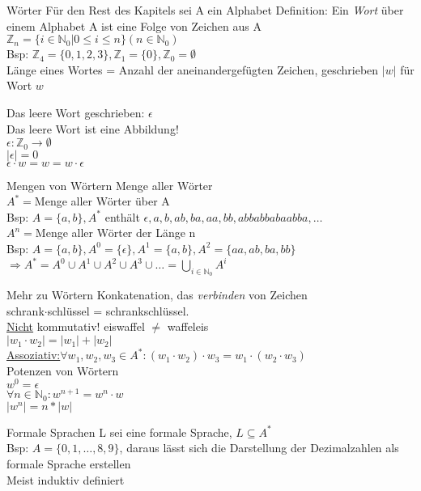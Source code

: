 \begin{frame}{Wörter}
	Für den Rest des Kapitels sei A ein Alphabet
	Definition: Ein \emph{Wort} über einem Alphabet A ist eine Folge von Zeichen aus A\\
	$\mathbb{Z}_{n}=\{i\in\mathbb{N}_{0}\vert0\leq i\leq n\} (n\in\mathbb{N}_{0})$\\
	Bsp: $\mathbb{Z}_{4} =\{0,1,2,3\},\mathbb{Z}_{1}=\{0\},\mathbb{Z}_{0}=\emptyset$\\
	Länge eines Wortes = Anzahl der aneinandergefügten Zeichen, geschrieben $\lvert w\rvert$ für Wort $w$\\
\end{frame}

\begin{frame}{Das leere Wort}
	geschrieben: $\epsilon$\\
	Das leere Wort ist eine Abbildung!\\
	$\epsilon :\mathbb{Z}_{0}\longrightarrow\emptyset$\\
	$\lvert\epsilon\rvert = 0$\\
	$\epsilon\cdot w = w = w\cdot\epsilon$\\
\end{frame}

\begin{frame}{Mengen von Wörtern}
	Menge aller Wörter\\
	$A^{\ast}=$Menge aller Wörter über A\\
	Bsp: $A = \{a, b\}, A^{\ast}$ enthält $\epsilon, a, b, ab, ba, aa, bb, abbabbabaabba,\dots$\\
	$A^{n}=$Menge aller Wörter der Länge n\\
	Bsp: $A=\{a,b\}, A^{0}=\{\epsilon\},A^{1}=\{a,b\},A^{2}=\{aa,ab,ba,bb\}$\\
	$\Rightarrow A^{\ast}=A^{0}\cup A^{1}\cup A^{2}\cup A^{3}\cup\dots = \bigcup\limits_{i\in\mathbb{N}_0}A^{i}$\\%
\end{frame}

\begin{frame}{Mehr zu Wörtern}
	Konkatenation, das \emph{verbinden} von Zeichen\\
	schrank$\cdot$schlüssel = schrankschlüssel.\\
	\underline{Nicht} kommutativ! eiswaffel $\neq$ waffeleis\\
	$\lvert w_{1}\cdot w_{2}\rvert =\lvert w_{1}\rvert + \lvert w_{2}\rvert$\\
	\underline{Assoziativ:}$\forall w_{1},w_{2},w_{3}\in A^{\ast}:(w_{1}\cdot w_{2})\cdot w_{3} = w_{1}\cdot (w_{2}\cdot w_{3})$\\
	Potenzen von Wörtern\\
	$w^{0}=\epsilon$\\
	$\forall n\in\mathbb{N}_{0}:w^{n+1}=w^{n}\cdot w$\\
	$\lvert w^{n}\rvert = n\ast \lvert w\rvert$\\
\end{frame}

\begin{frame}{Formale Sprachen}
	L sei eine formale Sprache, $L\subseteq A^{\ast}$\\
	Bsp: $A =\{0,1,\dots ,8,9\}$, daraus lässt sich die Darstellung der Dezimalzahlen als formale Sprache erstellen\\
	Meist induktiv definiert\\
\end{frame}


